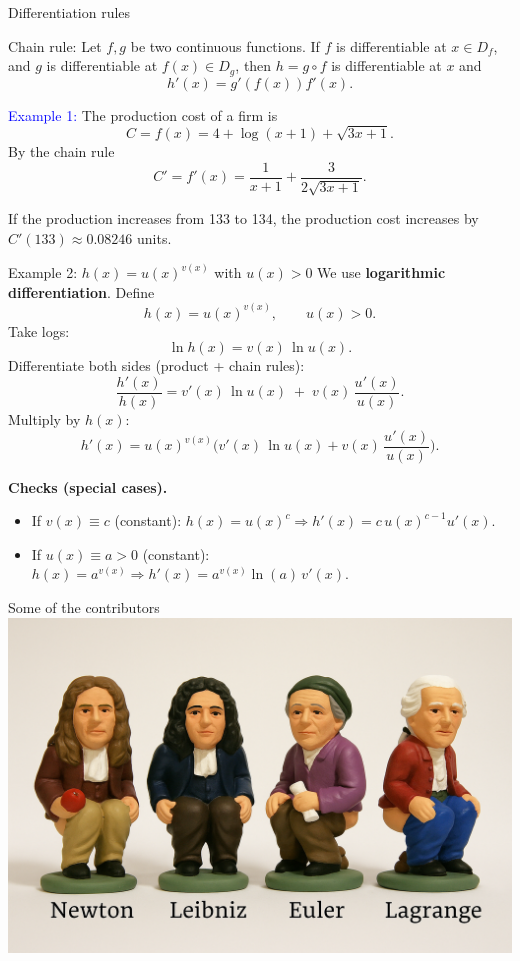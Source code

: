 \documentclass[11pt,aspectratio=169]{beamer}
\begin{document}
\begin{frame}{Differentiation rules}
\begin{alertblock}{Chain rule: }
	Let $f,g$ be two continuous functions. If $f$
is differentiable at $x \in D_f$, and $g$ is differentiable at $f(x)\in D_g$,
then $h=g \circ f$ is differentiable at $x$ and 
$$
h'(x)=g'(f(x)) f'(x).
$$
\end{alertblock}

\textcolor{blue}{Example 1:} The production cost of a firm  is
$$
C=f(x)=4+\log(x+1)+\sqrt{3x+1}.
$$
By the chain rule
$$
C'=f'(x)=\frac{1}{x+1}+\frac{3}{2\sqrt{3x+1}}.
$$
\begin{tiny}
 If the production increases from 133 to 134, the production cost increases  by $C'(133) \approx 0.08246$ units.
\end{tiny}
\end{frame}


\begin{frame}{Example 2: $h(x)=u(x)^{v(x)}$ with $u(x)>0$}
\small
We use \textbf{logarithmic differentiation}. Define
\[
h(x)=u(x)^{v(x)},\qquad u(x)>0.
\]
Take logs:
\[
\ln h(x) = v(x)\,\ln u(x).
\]
Differentiate both sides (product + chain rules):
\[
\frac{h'(x)}{h(x)} 
= v'(x)\,\ln u(x)\;+\;v(x)\,\frac{u'(x)}{u(x)}.
\]
Multiply by $h(x)$:
\[
\boxed{\;h'(x)=u(x)^{v(x)}
\Big(v'(x)\,\ln u(x) + v(x)\,\frac{u'(x)}{u(x)}\Big).\;}
\]

\medskip
\textbf{Checks (special cases).}
\begin{itemize}
\item If $v(x)\equiv c$ (constant): $h(x)=u(x)^c\Rightarrow 
h'(x)=c\,u(x)^{c-1}u'(x)$.
\item If $u(x)\equiv a>0$ (constant): $h(x)=a^{v(x)}\Rightarrow 
h'(x)=a^{v(x)}\ln(a)\,v'(x)$.
\end{itemize}
\end{frame}

\begin{frame}{Some of the contributors}
	\centering\includegraphics[scale=.2]{vbreaks/caganer1}
\end{frame}
\end{document}
